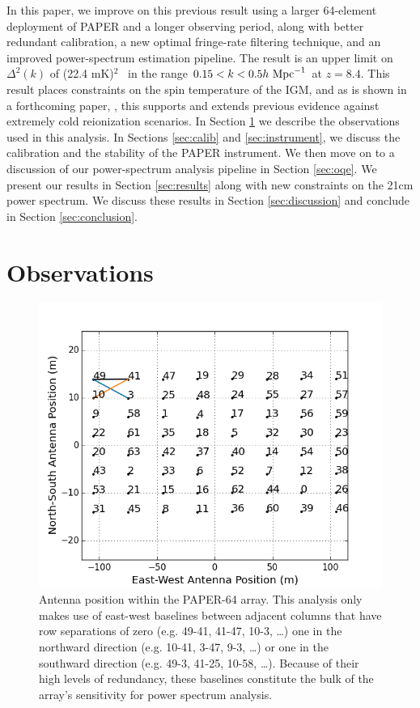 \documentclass[twocolumn,numberedappendix]{emulateapj} \shorttitle{New Limits on the 21 cm Power Spectrum at $z=8.4$}
\newcommand{\hMpci}{h\ {\rm Mpc}^{-1}}
\newcommand{\mKlimit}{(22.4 mK)$^2$ }
\begin{document}
In this paper, we improve on this previous result using
a larger 64-element deployment of PAPER and a longer observing period, along with better redundant calibration, a new
optimal fringe-rate filtering technique, and an improved power-spectrum estimation pipeline.
The result is an
upper limit on $\Delta^2(k)$ of \mKlimit~in the range
$0.15<k<0.5\hMpci$ at $z=8.4$.  This result places constraints on the 
spin temperature of the IGM, and as is shown in a forthcoming paper,
\citet{pober_et_al2015}, this supports and extends
previous evidence against extremely cold reionization scenarios.
In Section
\ref{sec:observations} we describe the observations used in this analysis. In
Sections \ref{sec:calib} and \ref{sec:instrument}, 
we discuss the calibration and 
the stability of the PAPER instrument.
We then move on to a discussion of our power-spectrum analysis pipeline in Section
\ref{sec:oqe}. 
We present our results in Section
\ref{sec:results} along with new constraints on the 21cm power spectrum.
We discuss these results in Section \ref{sec:discussion} and conclude in Section \ref{sec:conclusion}.



\section{Observations}\label{sec:observations}

\begin{figure}\centering
\includegraphics[width=\columnwidth]{plots/antenna_positions.png}
\caption{
Antenna position within the PAPER-64 array.
This analysis only makes use of
east-west baselines between adjacent columns that have row
separations of zero (e.g. 49-41, 41-47, 10-3, \dots)
one in the northward direction (e.g. 10-41, 3-47, 9-3, \dots) or
one in the southward direction (e.g. 49-3, 41-25, 10-58, \dots).
Because of their high levels of redundancy, 
these baselines constitute the bulk of the array's sensitivity for power
spectrum analysis.}
\label{fig:antenna_positions}
\end{figure}
\end{document}

